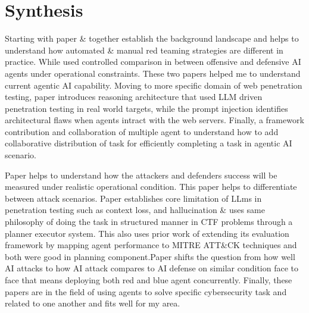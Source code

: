 \documentclass[12pt]{article}
\begin{document}
\section{Synthesis}


Starting with paper \cite{mulla2025automation} \& \cite{balassone2025cybersecurity} together establish the background landscape and helps to understand how automated \& manual red teaming strategies are different in practice. While \cite{balassone2025cybersecurity} used controlled comparison in between offensive and defensive AI agents under operational constraints. These two papers helped me to understand current agentic AI capability. Moving to more specific domain of web penetration testing, paper \cite{299699} introduces reasoning architecture that used LLM driven penetration testing in real world targets, while the prompt injection \cite{mayoral2025cybersecurity} identifies architectural flaws when agents intract with the web servers. Finally, a framework contribution \cite{udeshi2025d} and collaboration of multiple agent to understand how to add collaborative distribution of task for efficiently completing a task in agentic AI scenario. 


Paper \cite{balassone2025cybersecurity} helps to understand how the attackers and defenders success will be measured under realistic operational condition. This paper helps to differentiate between attack scenarios. Paper \cite{udeshi2025d} establishes core limitation of LLms in penetration testing such as context loss, and hallucination \& \cite{299699}  uses same philosophy of doing the task in structured manner in CTF problems through a planner executor system. This also uses prior work of \cite{299699} extending its evaluation framework by mapping agent performance to MITRE ATT\&CK techniques and both were good in planning component.Paper \cite{mayoral2025cybersecurity} shifts the question from how well AI attacks to how AI attack compares to AI defense on similar condition face to face that means deploying both red and blue agent concurrently. Finally, these papers are in the field of using agents to solve specific cybersecurity task and related to one another and fits well for my area.


\end{document}

